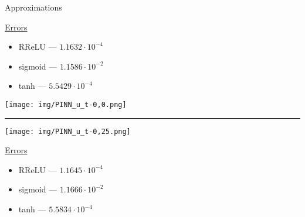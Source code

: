     \begin{frame}{Approximations}
            \hspace*{0.5cm}
            \vspace*{-0.5cm}
            \begin{minipage}{0.49\textwidth}
                \vspace*{-0.6cm}
                \scriptsize
                \underline{Errors}
                \begin{itemize}
                    \item \alert{RReLU --- $1.1632\cdot 10^{-4}$}
                    \item sigmoid --- $1.1586\cdot 10^{-2}$
                    \item tanh --- $5.5429\cdot 10^{-4}$
                \end{itemize}
            \end{minipage}
            \begin{minipage}{0.39\textwidth}
                {\centering
                \texttt{[image: img/PINN\_u\_t-0,0.png]}
                }
            \end{minipage}
        
            {\color{lightgray}\hrule}
            
            \vspace*{0.05cm}
            \begin{minipage}{0.59\textwidth}
                {\centering
                \texttt{[image: img/PINN\_u\_t-0,25.png]}
                }
            \end{minipage}
            \begin{minipage}{0.39\textwidth}
                    \scriptsize
                    \underline{Errors}
                    \begin{itemize}
                        \item \alert{RReLU --- $1.1645\cdot10^{-4}$}
                        \item sigmoid --- $1.1666\cdot10^{-2}$
                        \item tanh --- $5.5834\cdot 10^{-4}$
                    \end{itemize}
            \end{minipage}
    \end{frame}
    
